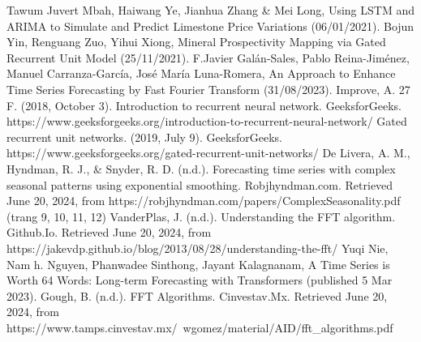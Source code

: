 \documentclass[conference]{IEEEtran}
\begin{document}
\begin{thebibliography}{00}
     Tawum Juvert Mbah, Haiwang Ye, Jianhua Zhang & Mei Long,
    Using LSTM and ARIMA to Simulate and Predict Limestone Price Variations (06/01/2021).
     Bojun Yin, Renguang Zuo, Yihui Xiong, Mineral Prospectivity Mapping via Gated Recurrent Unit Model (25/11/2021).
     F.Javier Galán-Sales, Pablo Reina-Jiménez, Manuel Carranza-García, José María Luna-Romera, An Approach to Enhance Time Series Forecasting by Fast Fourier Transform (31/08/2023).
    Improve, A. 27 F. (2018, October 3). Introduction to recurrent neural network. GeeksforGeeks. https://www.geeksforgeeks.org/introduction-to-recurrent-neural-network/
    Gated recurrent unit networks. (2019, July 9). GeeksforGeeks. https://www.geeksforgeeks.org/gated-recurrent-unit-networks/
    De Livera, A. M., Hyndman, R. J., & Snyder, R. D. (n.d.). Forecasting time series with complex seasonal patterns using exponential smoothing. Robjhyndman.com. Retrieved June 20, 2024, from https://robjhyndman.com/papers/ComplexSeasonality.pdf (trang 9, 10, 11, 12)
     VanderPlas, J. (n.d.). Understanding the FFT algorithm. Github.Io. Retrieved June 20, 2024, from https://jakevdp.github.io/blog/2013/08/28/understanding-the-fft/
     Yuqi Nie, Nam h. Nguyen, Phanwadee Sinthong, Jayant Kalagnanam, A Time Series is Worth 64 Words: Long-term Forecasting with Transformers (published 5 Mar 2023).
     Gough, B. (n.d.). FFT Algorithms. Cinvestav.Mx. Retrieved June 20, 2024, from https://www.tamps.cinvestav.mx/~wgomez/material/AID/fft_algorithms.pdf
    
    \end{thebibliography}
    \vspace{12pt}
\end{document}
